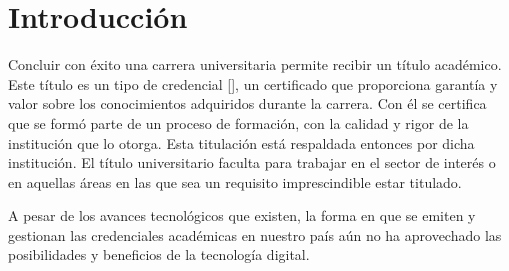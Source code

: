 \chapter*{Introducción}\label{chapter:introduction}



Concluir con éxito una carrera universitaria permite recibir un título académico. Este título es un tipo de credencial [\cite{1}], un certificado que proporciona garantía y valor sobre los conocimientos adquiridos durante la carrera. Con él se certifica que se formó parte de un proceso de formación, con la calidad y rigor de la institución que lo otorga. Esta titulación está respaldada entonces por dicha institución. El título universitario faculta para trabajar en el sector de interés o en aquellas áreas en las que sea un requisito imprescindible estar titulado.


A pesar de los avances tecnológicos que existen, la forma en que se emiten y gestionan las credenciales académicas en nuestro país aún no ha aprovechado las posibilidades y beneficios de la tecnología digital.

